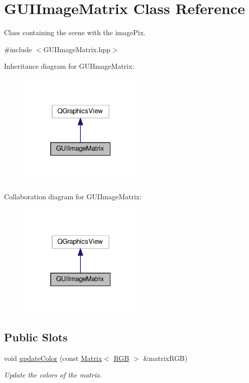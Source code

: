 \hypertarget{class_g_u_i_image_matrix}{}\section{G\+U\+I\+Image\+Matrix Class Reference}
\label{class_g_u_i_image_matrix}


Class containing the scene with the image\+Pix.  




{\ttfamily \#include $<$G\+U\+I\+Image\+Matrix.\+hpp$>$}



Inheritance diagram for G\+U\+I\+Image\+Matrix\+:
\nopagebreak
\begin{figure}[H]
\begin{center}
\leavevmode
\includegraphics[width=169pt]{class_g_u_i_image_matrix__inherit__graph}
\end{center}
\end{figure}


Collaboration diagram for G\+U\+I\+Image\+Matrix\+:
\nopagebreak
\begin{figure}[H]
\begin{center}
\leavevmode
\includegraphics[width=169pt]{class_g_u_i_image_matrix__coll__graph}
\end{center}
\end{figure}
\subsection*{Public Slots}
\begin{DoxyCompactItemize}
\item 
void \mbox{\hyperlink{class_g_u_i_image_matrix_a6aad00f51bc456d20dca7a53519cc623}{update\+Color}} (const \mbox{\hyperlink{class_matrix}{Matrix}}$<$ \mbox{\hyperlink{class_r_g_b}{R\+GB}} $>$ \&matrix\+R\+GB)
\begin{DoxyCompactList}\small\item\em Update the colors of the matrix. \end{DoxyCompactList}\end{DoxyCompactItemize}
